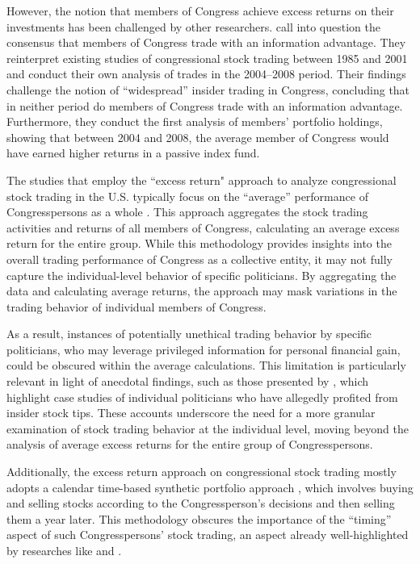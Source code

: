\documentclass[15pt,letterpaper]{article}
\begin{document}
However, the notion that members of Congress achieve excess returns on their investments has been challenged by other researchers. \cite{eg13} call into question the consensus that members of Congress trade with an information advantage. They reinterpret existing studies of congressional stock trading between 1985 and 2001 and conduct their own analysis of trades in the 2004–2008 period. Their findings challenge the notion of ``widespread'' insider trading in Congress, concluding that in neither period do members of Congress trade with an information advantage. Furthermore, they conduct the first analysis of members' portfolio holdings, showing that between 2004 and 2008, the average member of Congress would have earned higher returns in a passive index fund. 

The studies that employ the ``excess return" approach to analyze congressional stock trading in the U.S. typically focus on the ``average'' performance of Congresspersons as a whole \citep{zi24, zi11}. This approach aggregates the stock trading activities and returns of all members of Congress, calculating an average excess return for the entire group. 
While this methodology provides insights into the overall trading performance of Congress as a collective entity, it may not fully capture the individual-level behavior of specific politicians. By aggregating the data and calculating average returns, the approach may mask variations in the trading behavior of individual members of Congress. 

As a result, instances of potentially unethical trading behavior by specific politicians, who may leverage privileged information for personal financial gain, could be obscured within the average calculations. This limitation is particularly relevant in light of anecdotal findings, such as those presented by \cite{schweizer2011}, which highlight case studies of individual politicians who have allegedly profited from insider stock tips. These accounts underscore the need for a more granular examination of stock trading behavior at the individual level, moving beyond the analysis of average excess returns for the entire group of Congresspersons.

Additionally, the excess return approach on congressional stock trading mostly adopts a calendar time-based synthetic portfolio approach \citep{syn1, syn2, eg13}, which involves buying and selling stocks according to the Congressperson's decisions and then selling them a year later. This methodology obscures the importance of the ``timing'' aspect of such Congresspersons' stock trading, an aspect already well-highlighted by researches like \cite{schweizer2011} and \cite{tahoun2014}. 
\end{document}
